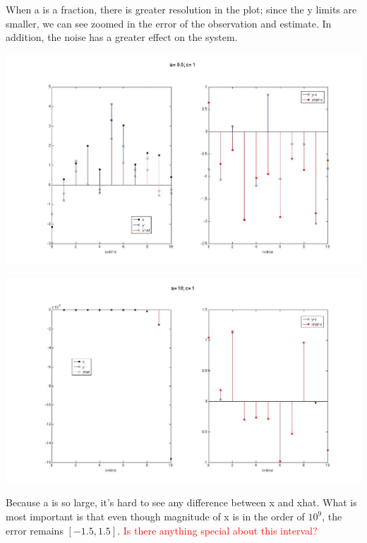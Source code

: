 \documentclass[leqno]{article}
\begin{document}
When a is a fraction, there is greater resolution in the plot; since the y limits are smaller, we can see zoomed in the error of the observation and estimate. In addition, the noise has a greater effect on the system.

\begin{center}\includegraphics[scale=0.3]{fig2}\end{center}

\begin{center}\includegraphics[scale=0.3]{fig3}\end{center}
Because a is so large, it's hard to see any difference between x and xhat. What is most important is that even though magnitude of x is in the order of $10^9$, the error remains $[-1.5,1.5]$. \textcolor{red}{Is there anything special about this interval?}
\end{document}
